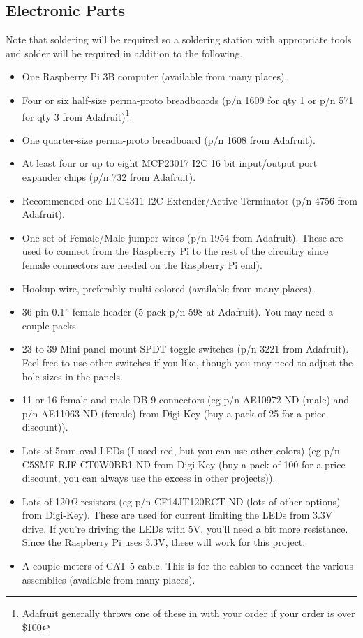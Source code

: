 \documentclass[10pt, openany]{book}
\begin{document}
\subsection{Electronic Parts}
Note that soldering will be required so a soldering station with appropriate tools and solder will be required in addition to the following.
\begin{itemize}
  \item One Raspberry Pi 3B computer (available from many places).
  \item Four or six half-size perma-proto breadboards (p/n 1609 for qty 1 or p/n 571 for qty 3 from Adafruit)\footnote{Adafruit generally throws one of these in with your order if your order is over \$100}.
  \item One quarter-size perma-proto breadboard (p/n 1608 from Adafruit).
  \item At least four or up to eight MCP23017 I2C 16 bit input/output port expander chips (p/n 732 from Adafruit).
  \item Recommended one LTC4311 I2C Extender/Active Terminator (p/n 4756 from Adafruit).
  \item One set of Female/Male jumper wires (p/n 1954 from Adafruit).  These are used to connect from the Raspberry Pi to the rest of the circuitry since female connectors are needed on the Raspberry Pi end).
  \item Hookup wire, preferably multi-colored (available from many places).
  \item 36 pin 0.1'' female header (5 pack p/n 598 at Adafruit).  You may need a couple packs.
  \item 23 to 39 Mini panel mount SPDT toggle switches (p/n 3221 from Adafruit).  Feel free to use other switches if you like, though you may need to adjust the hole sizes in the panels.
  \item 11 or 16 female and male DB-9 connectors (eg p/n AE10972-ND (male) and p/n AE11063-ND (female) from Digi-Key (buy a pack of 25 for a price discount)).
  \item Lots of 5mm oval LEDs (I used red, but you can use other colors) (eg p/n C5SMF-RJF-CT0W0BB1-ND from Digi-Key (buy a pack of 100 for a price discount, you can always use the excess in other projects)).
  \item Lots of 120$\Omega$ resistors (eg p/n CF14JT120RCT-ND (lots of other options) from Digi-Key).  These are used for current limiting the LEDs from 3.3V drive.  If you're driving the LEDs with 5V, you'll need a bit more resistance.  Since the Raspberry Pi uses 3.3V, these will work for this project.
  \item A couple meters of CAT-5 cable.  This is for the cables to connect the various assemblies (available from many places).
\end{itemize}
\end{document}
